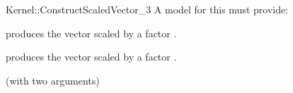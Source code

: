 \begin{ccRefFunctionObjectConcept}{Kernel::ConstructScaledVector_3}
A model for this must provide:


            {produces the vector  scaled by a factor .}

            {produces the vector  scaled by a factor .}


\ccRefines
{} (with two arguments)

\ccSeeAlso
{}\\

\end{ccRefFunctionObjectConcept}
